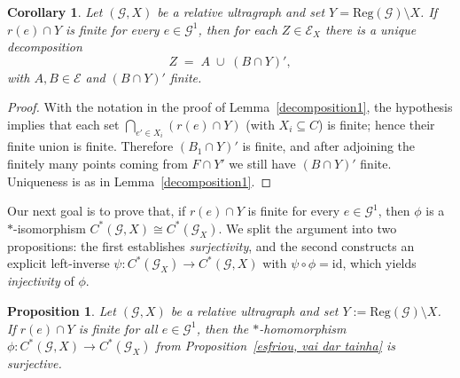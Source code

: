 \documentclass[12pt, reqno]{amsart}
\newtheorem{proposition}[theorem]{Proposition}
\newtheorem{corollary}[theorem]{Corollary}
\theoremstyle{definition}
\theoremstyle{remark}
\numberwithin{equation}{section}
\begin{document}
\begin{corollary}\label{decomposition2}
Let $(\mathcal{G},X)$ be a relative ultragraph and set $Y=\mathrm{Reg}(\mathcal{G})\setminus X$.
If $r(e)\cap Y$ is finite for every $e\in\mathcal{G}^1$, then for each $Z\in\mathcal{E}_X$ there
is a unique decomposition
\[
Z \;=\; A \;\cup\; (B\cap Y)',
\]
with $A,B\in\mathcal{E}$ and $(B\cap Y)'$ finite.
\end{corollary}

\begin{proof}
With the notation in the proof of Lemma~\ref{decomposition1}, the hypothesis implies
that each set $\bigcap_{e'\in X_i}(r(e)\cap Y)$ (with $X_i\subseteq C$) is finite; hence their
finite union is finite. Therefore $(B_1\cap Y)'$ is finite, and after adjoining the
finitely many points coming from $F\cap Y'$ we still have $(B\cap Y)'$ finite.
Uniqueness is as in Lemma~\ref{decomposition1}.
\end{proof}




Our next goal is to prove that, if $r(e)\cap Y$ is finite for every $e\in\mathcal{G}^1$, then
$\phi$ is a $*$-isomorphism $C^*(\mathcal{G},X)\cong C^*(\mathcal{G}_X)$. 
We split the argument into two propositions: the first establishes \emph{surjectivity}, and the
second constructs an explicit left-inverse $\psi:C^*(\mathcal{G}_X)\to C^*(\mathcal{G},X)$ with
$\psi\circ\phi=\mathrm{id}$, which yields \emph{injectivity} of $\phi$.

\begin{proposition}\label{surjective homomorphism}
Let $(\mathcal{G},X)$ be a relative ultragraph and set $Y:=\mathrm{Reg}(\mathcal{G})\setminus X$.
If $r(e)\cap Y$ is finite for all $e\in\mathcal{G}^1$, then the $*$-homomorphism
$\phi:C^*(\mathcal{G},X)\to C^*(\mathcal{G}_X)$ from Proposition~\ref{esfriou, vai dar tainha} is
surjective.
\end{proposition}
\end{document}
